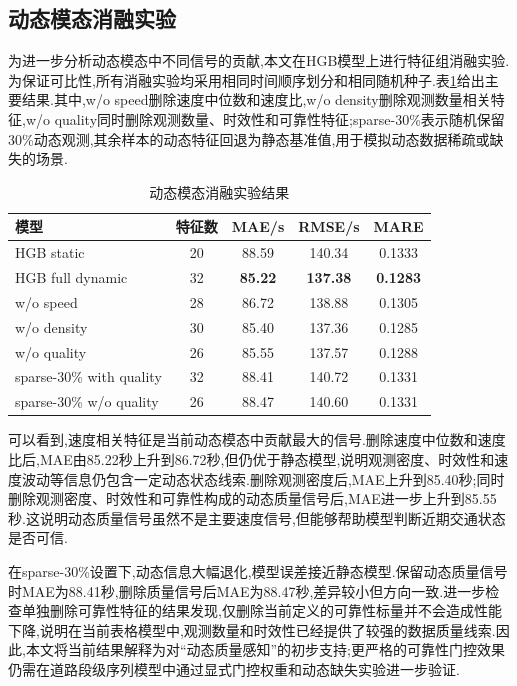 \documentclass{rjthesis}
\begin{document}
\subsection{动态模态消融实验}

为进一步分析动态模态中不同信号的贡献,本文在HGB模型上进行特征组消融实验.为保证可比性,所有消融实验均采用相同时间顺序划分和相同随机种子.表\ref{tab:ablation}给出主要结果.其中,w/o speed删除速度中位数和速度比,w/o density删除观测数量相关特征,w/o quality同时删除观测数量、时效性和可靠性特征;sparse-30\%表示随机保留30\%动态观测,其余样本的动态特征回退为静态基准值,用于模拟动态数据稀疏或缺失的场景.

\begin{table}[htbp]
	\centering
	\caption{动态模态消融实验结果}
	\label{tab:ablation}
	\begin{tabular}{lcccc}
		\toprule
		模型 & 特征数 & MAE/s & RMSE/s & MARE \\
		\midrule
		HGB static & 20 & 88.59 & 140.34 & 0.1333 \\
		HGB full dynamic & 32 & \textbf{85.22} & \textbf{137.38} & \textbf{0.1283} \\
		w/o speed & 28 & 86.72 & 138.88 & 0.1305 \\
		w/o density & 30 & 85.40 & 137.36 & 0.1285 \\
		w/o quality & 26 & 85.55 & 137.57 & 0.1288 \\
		sparse-30\% with quality & 32 & 88.41 & 140.72 & 0.1331 \\
		sparse-30\% w/o quality & 26 & 88.47 & 140.60 & 0.1331 \\
		\bottomrule
	\end{tabular}
\end{table}

可以看到,速度相关特征是当前动态模态中贡献最大的信号.删除速度中位数和速度比后,MAE由85.22秒上升到86.72秒,但仍优于静态模型,说明观测密度、时效性和速度波动等信息仍包含一定动态状态线索.删除观测密度后,MAE上升到85.40秒;同时删除观测密度、时效性和可靠性构成的动态质量信号后,MAE进一步上升到85.55秒.这说明动态质量信号虽然不是主要速度信号,但能够帮助模型判断近期交通状态是否可信.

在sparse-30\%设置下,动态信息大幅退化,模型误差接近静态模型.保留动态质量信号时MAE为88.41秒,删除质量信号后MAE为88.47秒,差异较小但方向一致.进一步检查单独删除可靠性特征的结果发现,仅删除当前定义的可靠性标量并不会造成性能下降,说明在当前表格模型中,观测数量和时效性已经提供了较强的数据质量线索.因此,本文将当前结果解释为对``动态质量感知''的初步支持;更严格的可靠性门控效果仍需在道路段级序列模型中通过显式门控权重和动态缺失实验进一步验证.
\end{document}
